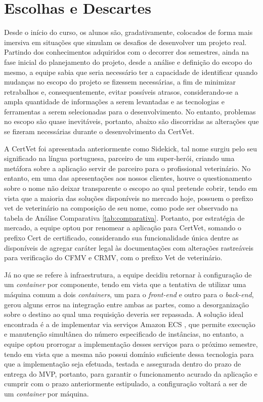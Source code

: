 \documentclass[
    12pt,               %
    openright,          %
    oneside,
    a4paper,            %
    BIBLATEX,           %
    TODO,               %
    english,            %
    brazil              %
    ]{ifsp-spo-inf-ctds}
\begin{document}
    \section{Escolhas e Descartes}
    Desde o início do curso, os alunos são, gradativamente, colocados de forma mais imersiva em situações que simulam os desafios de desenvolver um projeto real. Partindo dos conhecimentos adquiridos com o decorrer dos semestres, ainda na fase inicial do planejamento do projeto, desde a análise e definição do escopo do mesmo, a equipe sabia que seria necessário ter a capacidade de identificar quando mudanças no escopo do projeto se fizessem necessárias, a fim de minimizar retrabalhos e, consequentemente, evitar possíveis atrasos, considerando-se a ampla quantidade de informações a serem levantadas e as tecnologias e ferramentas a serem selecionadas para o desenvolvimento. No entanto, problemas no escopo são quase inevitáveis, portanto, abaixo são discorridas as alterações que se fizeram necessárias durante o desenvolvimento da CertVet.

    A CertVet foi apresentada anteriormente como Sidekick, tal nome surgiu pelo seu significado na língua portuguesa, parceiro de um super-herói, criando uma metáfora sobre a aplicação servir de parceiro para o profissional veterinário. No entanto, em uma das apresentações aos nossos clientes, houve o questionamento sobre o nome não deixar transparente o escopo ao qual pretende cobrir, tendo em vista que a maioria das soluções disponíveis no mercado hoje, possuem o prefixo vet de veterinário na composição de seu nome, como pode ser observado na tabela de Análise Comparativa \ref{tab:comparativa}. Portanto, por estratégia de mercado, a equipe optou por renomear a aplicação para CertVet, somando o prefixo Cert de certificado, considerando sua funcionalidade única dentre as disponíveis de agregar caráter legal às documentações com alterações rastreáveis para verificação do CFMV e CRMV, com o prefixo Vet de veterinário.

    Já no que se refere à infraestrutura, a equipe decidiu retornar à configuração de um \emph{container} por componente, tendo em vista que a tentativa de utilizar uma máquina comum a dois \emph{containers}, um para o \emph{front-end} e outro para o \emph{back-end}, gerou alguns erros na integração entre ambas as partes, como a desorganização sobre o destino ao qual uma requisição deveria ser repassada. A solução ideal encontrada é a de implementar via serviços Amazon ECS , que permite execução e manutenção simultânea do número especificado de instâncias, no entanto, a equipe optou prorrogar a implementação desses serviços para o próximo semestre, tendo em vista que a mesma não possui domínio suficiente dessa tecnologia para que a implementação seja efetuada, testada e assegurada dentro do prazo de entrega do MVP, portanto, para garantir o funcionamento acurado da aplicação e cumprir com o prazo anteriormente estipulado, a configuração voltará a ser de um \emph{container} por máquina.
\end{document}
